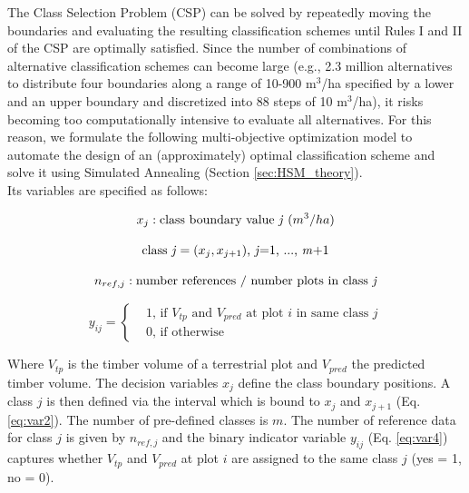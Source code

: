 The Class Selection Problem (CSP) can be solved by repeatedly moving the boundaries and evaluating the resulting classification schemes until Rules I and II of the CSP are optimally satisfied. Since the number of combinations of alternative classification schemes can become large (e.g., 2.3 million alternatives to distribute four boundaries along a range of 10-900 m$^3$/ha specified by a lower and an upper boundary and discretized into 88 steps of 10 m$^3$/ha), it risks becoming too computationally intensive to evaluate all alternatives. For this reason, we formulate the following multi-objective optimization model to automate the design of an (approximately) optimal classification scheme and solve it using Simulated Annealing (Section \ref{sec:HSM_theory}).\\

Its variables are specified as follows:

\begin{equation}\label{eq:var1}
x_j: \text{class boundary value \textit{j} } (m^3/ha)
\end{equation}

\begin{equation}\label{eq:var2}
\text{class \textit{j}}=(x_j, x_{j+1}) \text{, \textit{j}=1, ..., \textit{m}+1}
\end{equation}

\begin{equation}\label{eq:var3}
n_{ref,j}: \text{number references / number plots in class \textit{j}}
\end{equation}

\begin{equation}\label{eq:var4}
y_{ij}=\begin{cases}&1 \text{, if $V_{tp}$ and $V_{pred}$ at plot $i$ in same class $j$}\\
&0 \text{, if otherwise}
\end{cases}
\end{equation}

Where $V_{tp}$ is the timber volume of a terrestrial plot and $V_{pred}$ the predicted timber volume. The decision
variables $x_j$ define the class boundary positions. A class $j$ is then defined via the interval which is bound to $x_j$ and $x_{j+1}$ (Eq. \ref{eq:var2}). The number of pre-defined classes is $m$. The number of reference data for class
$j$ is given by $n_{ref,j}$ and the binary indicator variable $y_{ij}$ (Eq. \ref{eq:var4}) captures whether $V_{tp}$ and $V_{pred}$ at plot $i$ are assigned to the same class $j$ (yes = 1, no = 0).\\

